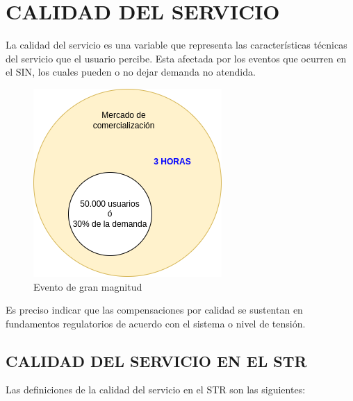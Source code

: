 \documentclass[a5paper]{book}%
\begin{document}
\chapter{CALIDAD DEL SERVICIO}

La calidad del servicio  es una variable que representa las características técnicas del servicio que el usuario percibe. Esta afectada por los eventos que ocurren en
el \ac{SIN}, los cuales pueden o no dejar demanda no atendida.

\begin{figure}[H]
  \centering
  \caption{Evento de gran magnitud}
  \label{fig:eventogranmagnitud}
  \includegraphics[width=0.6\linewidth]{evento_gran_magnitud}
\end{figure}

Es preciso indicar que las compensaciones por calidad se sustentan en fundamentos regulatorios
de acuerdo con el sistema o nivel de tensión.


\section{CALIDAD DEL SERVICIO EN EL STR}

Las definiciones de la calidad del servicio en el \ac{STR} son las siguientes:
\end{document}

